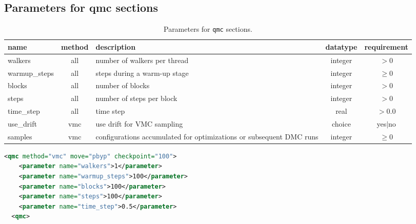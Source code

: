 \subsection{Parameters for qmc sections}\label{common.sec}

\begin{table}[h]
\begin{center}
\begin{tabular}{l c p{} c c }
\hline
\bfseries name & \bfseries method& \bfseries description & \bfseries datatype & \bfseries requirement \\
\hline
walkers & all & number of walkers per thread & integer& $> 0$ \\
warmup\_steps & all & steps during a warm-up stage& integer& $\geq 0$ \\
blocks & all& number of blocks  & integer& $> 0$ \\
steps& all& number of steps per block & integer&  $> 0$ \\
time\_step& all & time step & real& $> 0.0$ \\
use\_drift& vmc & use drift for VMC sampling & choice& yes$|$no \\
samples& vmc & configurations accumulated for optimizations or subsequent DMC runs & integer& $\geq 0$ \\
\hline
\end{tabular}
\end{center}
\caption{Parameters for \texttt{qmc} sections. }
\label{req.packages}
\end{table}


\begin{lstlisting}[language=xml,
emph={qmc,parameter},emphstyle=\bfseries\color{blue}]
  <qmc method="vmc" move="pbyp" checkpoint="100">
    <parameter name="walkers">1</parameter>
    <parameter name="warmup_steps">100</parameter>
    <parameter name="blocks">100</parameter>
    <parameter name="steps">100</parameter>
    <parameter name="time_step">0.5</parameter>
  <qmc>
\end{lstlisting}

